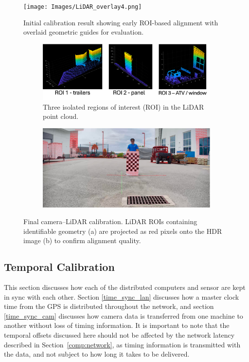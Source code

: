 \documentclass{erauthesis}
\begin{document}
\begin{figure}[ht]
    \centering
    \texttt{[image: Images/LiDAR\_overlay4.png]}
    \caption{Initial calibration result showing early ROI-based alignment with overlaid geometric guides for evaluation.}
    \label{fig:LiDAR_overlay4}
\end{figure}
\begin{figure}[htp]
\begin{subfigure}{\textwidth}
\centering
\includegraphics[width=0.94\linewidth]{Images/LiDAR_overlay3A.png}
    \caption{Three isolated regions of interest (ROI) in the LiDAR point cloud.}
    \label{fig:LiDAR_overlay3A}
\end{subfigure}
\bigskip
\begin{subfigure}{\textwidth}
\centering
\includegraphics[width=0.94\linewidth]{Images/LiDAR_overlay3B.png}
    \caption{}
    \label{fig:LiDAR_overlay3B.png}
\end{subfigure}
\caption{Final camera–LiDAR calibration. LiDAR ROIs containing identifiable geometry (a) are projected as red pixels onto the HDR image (b) to confirm alignment quality.}
\label{HDR_calib_final}
\end{figure}
\subsection{Temporal Calibration}
\label{time_sync}

This section discusses how each of the distributed computers and sensor are kept in sync with each other.
Section \ref{time_sync_lan} discusses how a master clock time from the GPS is distributed throughout the network, and section \ref{time_sync_cam} discusses how camera data is transferred from one machine to another without loss of timing information.
It is important to note that the temporal offsets discussed here should not be affected by the network latency described in Section~\ref{comp:network}, as timing information is transmitted with the data, and not subject to how long it takes to be delivered. 
\end{document}
